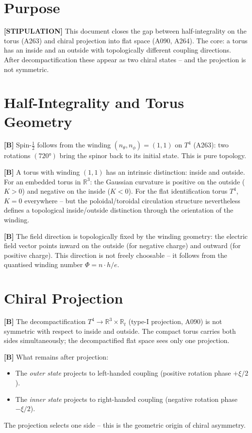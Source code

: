 \section{Purpose}

\textbf{[STIPULATION]} This document closes the gap between half-integrality
on the torus (A263) and chiral projection into flat space (A090, A264). The
core: a torus has an inside and an outside with topologically different coupling
directions. After decompactification these appear as two chiral states -- and
the projection is not symmetric.

\section{Half-Integrality and Torus Geometry}

\textbf{[B]} Spin-$\tfrac12$ follows from the winding $(n_\theta,n_\phi)=(1,1)$
on $T^4$ (A263): two rotations $(720°)$ bring the spinor back to its initial
state. This is pure topology.

\textbf{[B]} A torus with winding $(1,1)$ has an intrinsic distinction: inside
and outside. For an embedded torus in $\mathbb{R}^3$: the Gaussian curvature is
positive on the outside ($K>0$) and negative on the inside ($K<0$). For the
flat identification torus $T^4$, $K=0$ everywhere -- but the poloidal/toroidal
circulation structure nevertheless defines a topological inside/outside
distinction through the orientation of the winding.

\textbf{[B]} The field direction is topologically fixed by the winding geometry:
the electric field vector points inward on the outside (for negative charge) and
outward (for positive charge). This direction is not freely choosable -- it
follows from the quantised winding number $\Phi=n\cdot h/e$.

\section{Chiral Projection}

\textbf{[B]} The decompactification $T^4\to\mathbb{R}^3\times\mathbb{R}_t$
(type-I projection, A090) is not symmetric with respect to inside and outside.
The compact torus carries both sides simultaneously; the decompactified flat
space sees only one projection.

\textbf{[B]} What remains after projection:
\begin{itemize}[leftmargin=2em,itemsep=2pt,topsep=2pt]
  \item The \emph{outer state} projects to left-handed coupling
    (positive rotation phase $+\xi/2$).
  \item The \emph{inner state} projects to right-handed coupling
    (negative rotation phase $-\xi/2$).
\end{itemize}
The projection selects one side -- this is the geometric origin of chiral
asymmetry.

